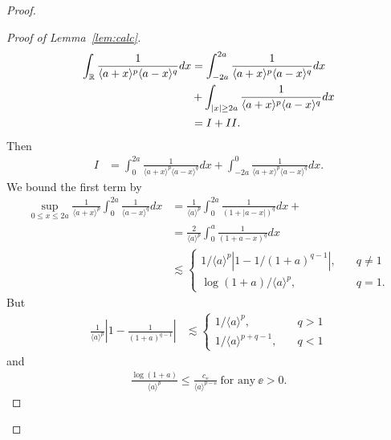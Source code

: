 \begin{proof}
\begin{proof}[Proof of Lemma~\ref{lem:calc}]
\begin{equation*}
\begin{split}
\int_{\mathbb{R}} \frac{1}{\langle a + x \rangle ^{p} \langle a - x \rangle
  ^{q}} d x
  & = \int_{-2a}^{2a}
  \frac{1}{\langle a + x \rangle ^{p} \langle a - x \rangle
  ^{q}} d x
  \\
  & + \int_{| x | \ge 2a} 
\frac{1}{\langle a + x \rangle ^{p} \langle a - x \rangle
  ^{q}} d x
  \\
  & = I + II.
\end{split}
\end{equation*}
%
%
Then
\begin{equation*}
\begin{split}
  I 
  & = \int_{0}^{2a}
  \frac{1}{\langle a + x \rangle ^{p} \langle a - x \rangle
  ^{q}} d x + \int_{-2a}^{0}
  \frac{1}{\langle a + x \rangle ^{p} \langle a - x \rangle
  ^{q}} d x.
\end{split}
\end{equation*}
We bound the first term by
\begin{equation*}
  \begin{split}
  \sup_{0 \le x \le 2a} \frac{1}{\langle a + x \rangle
  ^{p}} \int_{0}^{2a} \frac{1}{\langle a - x \rangle ^{q}} d x
  & = \frac{1}{\langle a \rangle ^{p}} \int_{0}^{2a} \frac{1}{(1 + | a -
  x
  |)^{q}} d x + 
  \\
  & = \frac{2}{\langle a \rangle ^{p}} \int_{0}^{a} \frac{1}{(1 + a -
  x)^{q}} d x
  \\
  & \lesssim
  \begin{cases}
    1/{\langle a \rangle ^{p}} \left| 1 - 1/{(1 +
    a)^{q -1}} \right|, \quad & q \neq 1
    \\
    \log(1+a)/{\langle a \rangle^{p} }, \quad & q =1.
  \end{cases}
  \end{split}
\end{equation*}
%
But
%
%
\begin{equation*}
\begin{split}
\frac{1}{\langle a \rangle ^{p}}\left| 1 - \frac{1}{(1 +
    a)^{q -1}} \right|
    & \lesssim
    \begin{cases}
      1/{\langle a \rangle^{p} }, \quad & q > 1
      \\
      1/{\langle a \rangle ^{p + q -1}}, \quad & q < 1
    \end{cases}
\end{split}
\end{equation*}
%
%
and
%
%
\begin{equation*}
\begin{split}
  \frac{\log(1 + a)}{\langle a \rangle^{p} } \le  \frac{c_{\ee}}{\langle a
    \rangle ^{p - \ee}} \ \text{for any} \ \ee > 0.
\end{split}
\end{equation*}


\end{proof}
\end{proof}
